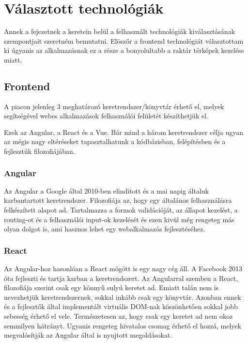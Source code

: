 \chapter{Választott technológiák}

Annek a fejezetnek a keretein belül a felhasznált technológiák kiválasztásának szempontjait szeretném bemutatni. 
Elöszőr a frontend technológiát választottam ki úgyanis az alkalmazásnak ez a része a bonyolultabb a raktár térképek kezelése miatt.

\section{Frontend}

A piacon jelenleg 3 meghatározó keretrendszer/könyvtár érhető el, melyek segítségével webes alkalmazások felhasználói felületét készíthetjük el.

Ezek az Angular, a React és a Vue. 
Bár mind a három keretrendszer célja ugyan az mégis nagy eltéréseket tapasztalhatunk a kódbázisban, felépítésben és a fejlesztúk filozofiájában.

\subsection{Angular}

Az Angular a Google által 2010-ben elinditott és a mai napig általuk karbantartott keretrendszer.
Filozofiája az, hogy egy általános felhasználásra felkészített alapot ad. 
Tartalmazza a formok validációját, az állapot kezelést, a routing-ot és a felhasználói input-ok kezelését és ezen kivül még rengeteg más olyan dolgot is, ami hasznos lehet egy webalkalmazás fejlesztéséhez.

\subsection{React}

Az Angular-hoz hasonlóan a React mögött is egy nagy cég áll.
A Facebook 2013 óta fejleszti és tartja karban a keretrendszert.
Az Angularral szemben a React, filozofiája szerint csak egy könnyű sulyú keretet ad. 
Emiatt talán nem is nevezhetjük keretrendszernek, sokkal inkább csak egy könyvtár. 
Azonban ennek és a fejlesztők által implementált virtuális DOM-nak köszönhetően sokkal jobb sebesség érhető el vele.
Természetesen az, hogy csak egy keretet ad nem okoz semmilyen hátrányt.
Ugyanis rengeteg hivatalos csomag érhető el hozzá, melyek megvalósítják az Angular által is nyujtott megoldásokat.

